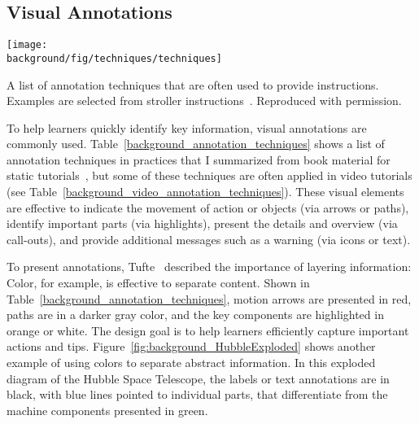 
\subsection{Visual Annotations}

\begin{table*}[!htbp]
  \centering
  \texttt{[image: \\background/fig/techniques/techniques]}
  \caption{A list of annotation techniques that are often used to provide instructions. Examples are selected from stroller instructions~\cite{MountainBuggyInstructions}. Reproduced with permission.}
  \label{background_annotation_techniques}
\end{table*}

To help learners quickly identify key information, visual annotations are commonly used. Table~\ref{background_annotation_techniques} shows a list of annotation techniques in practices that I summarized from book material for static tutorials~\cite{mijksenaar1999open,greenberg2012sketching,Buxton:2007:SUE:1526229,tufte1990envisioning}, but some of these techniques are often applied in video tutorials (see Table~\ref{background_video_annotation_techniques}).
%
These visual elements are effective to indicate the movement of action or objects (via arrows or paths), identify important parts (via highlights), present the details and overview (via call-outs), and provide additional messages such as a warning (via icons or text).

To present annotations, Tufte~\cite{tufte1990envisioning} described the importance of layering information: 
%
Color, for example, is effective to separate content. Shown in Table~\ref{background_annotation_techniques}, motion arrows are presented in red, paths are in a darker gray color, and the key components are highlighted in orange or white. The design goal is to help learners efficiently capture important actions and tips.
%
Figure~\ref{fig:background_HubbleExploded} shows another example of using colors to separate abstract information. In this exploded diagram of the Hubble Space Telescope, the labels or text annotations are in black, with blue lines pointed to individual parts, that differentiate from the machine components presented in green.

